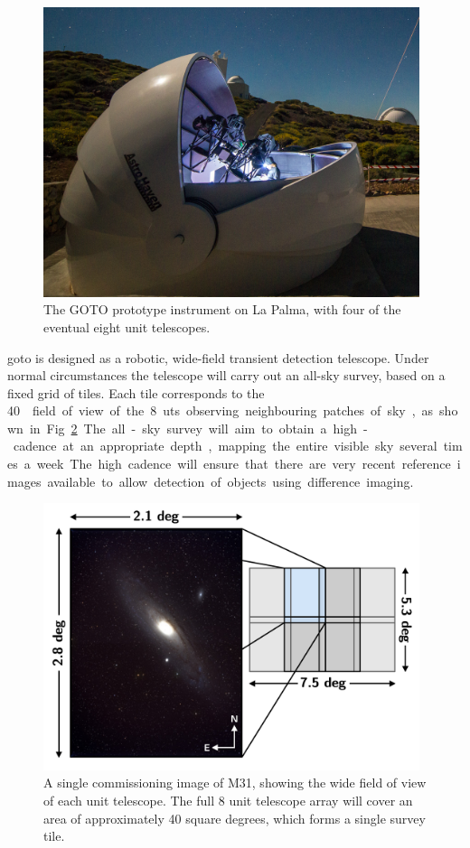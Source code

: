 \begin{figure}[htb]
\begin{center}
\includegraphics[width=11cm]{images/goto_photo.jpg}
\end{center}
\caption[The GOTO prototype instrument]{The GOTO prototype instrument on La Palma, with four of the eventual eight unit telescopes.}
\label{fig:goto_photo}
\end{figure}

\gls{goto} is designed as a robotic, wide-field transient detection telescope. Under normal circumstances the telescope will carry out an all-sky survey, based on a fixed grid of tiles. Each tile corresponds to the \SI{40}{\square\deg} field of view of the 8 \glspl{ut} observing neighbouring patches of sky, as shown in Fig.~\ref{fig:tiles}. The all-sky survey will aim to obtain a high-cadence at an appropriate depth, mapping the entire visible sky several times a week. The high cadence will ensure that there are very recent reference images available to allow detection of objects using difference imaging.

\begin{figure}[htb]
\begin{center}
\includegraphics[width=11cm]{images/tiles.pdf}
\end{center}
\caption[M31]{A single commissioning image of M31, showing the wide field of view of each unit telescope. The full 8 unit telescope array will cover an area of approximately 40 square degrees, which forms a single survey tile.}
\label{fig:tiles}
\end{figure}

